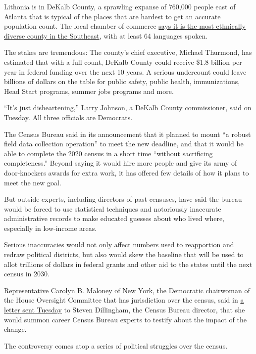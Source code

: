 Lithonia is in DeKalb County, a sprawling expanse of 760,000 people east
of Atlanta that is typical of the places that are hardest to get an
accurate population count. The local chamber of commerce
\href{https://www.dekalbchamber.org/why-dekalb/}{says it is the most
ethnically diverse county in the Southeast}, with at least 64 languages
spoken.

The stakes are tremendous: The county's chief executive, Michael
Thurmond, has estimated that with a full count, DeKalb County could
receive \$1.8 billion per year in federal funding over the next 10
years. A serious undercount could leave billions of dollars on the table
for public safety, public health, immunizations, Head Start programs,
summer jobs programs and more.

``It's just disheartening,'' Larry Johnson, a DeKalb County
commissioner, said on Tuesday. All three officials are Democrats.

The Census Bureau said in its announcement that it planned to mount ``a
robust field data collection operation'' to meet the new deadline, and
that it would be able to complete the 2020 census in a short time
``without sacrificing completeness.'' Beyond saying it would hire more
people and give its army of door-knockers awards for extra work, it has
offered few details of how it plans to meet the new goal.

But outside experts, including directors of past censuses, have said the
bureau would be forced to use statistical techniques and notoriously
inaccurate administrative records to make educated guesses about who
lived where, especially in low-income areas.

Serious inaccuracies would not only affect numbers used to reapportion
and redraw political districts, but also would skew the baseline that
will be used to allot trillions of dollars in federal grants and other
aid to the states until the next census in 2030.

Representative Carolyn B. Maloney of New York, the Democratic chairwoman
of the House Oversight Committee that has jurisdiction over the census,
said in
\href{https://oversight.house.gov/sites/democrats.oversight.house.gov/files/2020-08-04.CBM\%20to\%20Dillingham\%20re\%20Transcribed\%20Interviews.pdf}{a
letter sent Tuesday} to Steven Dillingham, the Census Bureau director,
that she would summon career Census Bureau experts to testify about the
impact of the change.

The controversy comes atop a series of political struggles over the
census.

